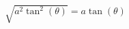 \documentclass[preview]{standalone}
\begin{document}
\begin{align*}
\sqrt{a^2\tan^2(\theta)} = a\tan(\theta)
\end{align*}
\end{document}
